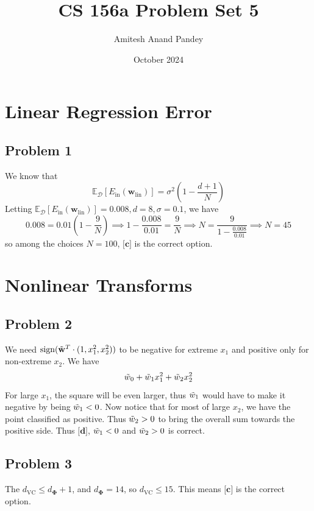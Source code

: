 \documentclass{article}
\title{CS 156a Problem Set 5}
\author{Amitesh Anand Pandey}
\date{October 2024}
\begin{document}
\maketitle
\section*{Linear Regression Error}
\subsection*{Problem 1}
We know that 
\begin{equation*}
    \mathbb{E}_{\mathcal{D}}[E_{\text{in}}(\mathbf{w}_{\text{lin}})] = \sigma^{2}\left(1 - \frac{d+1}{N}\right)
\end{equation*}
Letting $\mathbb{E}_{\mathcal{D}}[E_{\text{in}}(\mathbf{w}_{\text{lin}})] = 0.008, d=8, \sigma = 0.1$, we have
\begin{equation*}
    0.008 = 0.01\left(1 - \frac{9}{N}\right) \implies 1 - \frac{0.008}{0.01} = \frac{9}{N} \implies N = \frac{9}{1 - \frac{0.008}{0.01}} \implies N = 45
\end{equation*}
so among the choices $N = 100$, $\textbf{[c]}$ is the correct option.
\section*{Nonlinear Transforms}
\subsection*{Problem 2}
We need $\text{sign}(\Tilde{\mathbf{w}}^{T}\cdot(1,x_{1}^{2},x_{2}^{2}))$ to be negative for extreme $x_1$ and positive only for non-extreme $x_2$. We have
\begin{equation*}
    \Tilde{w}_0 + \Tilde{w}_{1}x_{1}^{2} + \Tilde{w}_{2}x_{2}^{2}
\end{equation*}
For large $x_{1}$, the square will be even larger, thus $\Tilde{w}_{1}$ would have to make it negative by being $\Tilde{w}_{1} < 0$. Now notice that for most of large $x_{2}$, we have the point classified as positive. Thus $\Tilde{w}_{2} > 0$ to bring the overall sum towards the positive side. Thus $\textbf{[d]}$, $\Tilde{w}_{1} < 0$ and $\Tilde{w}_{2} > 0$ is correct.
\subsection*{Problem 3}
The $d_{\text{VC}} \leq d_{\mathbf{\Phi}}  +1$, and $d_{\mathbf{\Phi}} = 14$, so $d_{\text{VC}} \leq 15$. This means $\textbf{[c]}$ is the correct option.
\newpage
\end{document}
